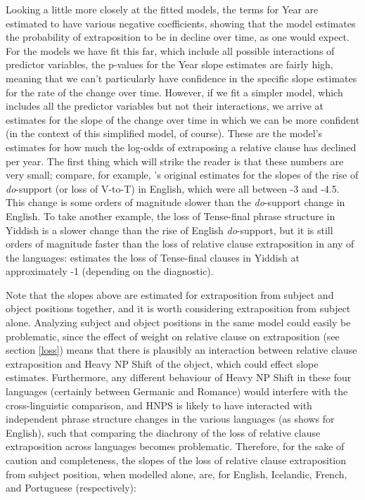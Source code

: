 Looking a little more closely at the fitted models, the terms for Year are estimated to have various negative coefficients, showing that the model estimates the probability of extraposition to be in decline over time, as one would expect. For the models we have fit this far, which include all possible interactions of predictor variables, the p-values for the Year slope estimates are fairly high, meaning that we can't particularly have confidence in the specific slope estimates for the rate of the change over time. However, if we fit a simpler model, which includes all the predictor variables but not their interactions, we arrive at estimates for the slope of the change over time in which we can be more confident (in the context of this simplified model, of course). 
These are the model's estimates for how much the log-odds of extraposing a relative clause has declined per year. The first thing which will strike the reader is that these numbers are very small; compare, for example, \citealt{kroch1989}'s original estimates for the slopes of the rise of \textsl{do}-support (or loss of V-to-T) in English, which were all between -3 and -4.5. This change is some orders of magnitude slower than the \textsl{do}-support change in English. To take another example, the loss of Tense-final phrase structure in Yiddish is a slower change than the rise of English \textsl{do}-support, but it is still orders of magnitude faster than the loss of relative clause extraposition in any of the languages: \citet{santorini1993a} estimates the loss of Tense-final clauses in Yiddish at approximately -1 (depending on the diagnostic).

Note that the slopes above are estimated for extraposition from subject and object positions together, and it is worth considering extraposition from subject alone. Analyzing subject and object positions in the same model could easily be problematic, since the effect of weight on relative clause on extraposition (see section \ref{loss}) means that there is plausibly an interaction between relative clause extraposition and Heavy NP Shift of the object, which could effect slope estimates. Furthermore, any different behaviour of Heavy NP Shift in these four languages (certainly between Germanic and Romance) would interfere with the cross-linguistic comparison, and HNPS is likely to have interacted with independent phrase structure changes in the various languages (as \citealt{wallenberg2015} shows for English), such that comparing the diachrony of the loss of relative clause extraposition across languages becomes problematic. Therefore, for the sake of caution and completeness, the slopes of the loss of relative clause extraposition from subject position, when modelled alone, are, for English, Icelandic, French, and Portuguese (respectively): 

